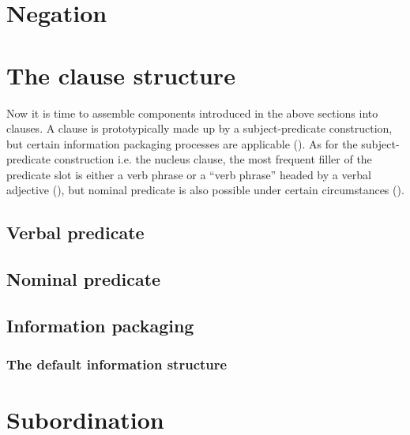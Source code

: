 \documentclass[UTF8, a4paper, oneside, scheme=plain]{ctexart}
\newcommand*{\citesec}[1]{\S~{#1}}
\begin{document}
\section{Negation}

\section{The clause structure}

Now it is time to assemble components introduced in the above sections into clauses.
A clause is prototypically made up by a subject-predicate construction,
but certain information packaging processes are applicable (). 
As for the subject-predicate construction i.e. the nucleus clause,
the most frequent filler of the predicate slot is either 
a verb phrase or a ``verb phrase'' headed by a verbal adjective (),
but nominal predicate is also possible under certain circumstances (). 


\subsection{Verbal predicate}\label{sec:verbal-predicate}

\subsection{Nominal predicate}\label{sec:nominal-predicate}

\citet[\citesec{7.6}]{zhudexigrammar}


\subsection{Information packaging}\label{sec:information-packaging}

\subsubsection{The default information structure}


\section{Subordination}



\end{document}
